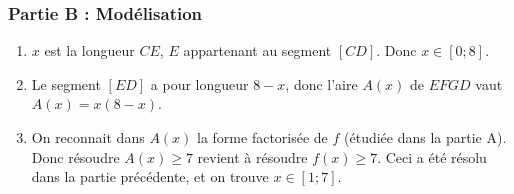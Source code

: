\documentclass[12pt]{article}
\begin{document}
\begin{exercice}
  \subsubsection*{Partie B : Modélisation}
  \begin{enumerate}
    \item $x$ est la longueur $CE$, $E$ appartenant au segment $[CD]$. Donc
      $x\in\left[0;8\right]$.
    \item Le segment $[ED]$ a pour longueur $8-x$, donc l'aire $A(x)$ de $EFGD$ vaut $A(x)=x(8-x)$.
    \item On reconnait dans $A(x)$ la forme factorisée de $f$ (étudiée dans
      la partie A). Donc résoudre $A(x)\geq7$ revient à résoudre $f(x)\geq7$.
      Ceci a été résolu dans la partie précédente, et on trouve
      $x\in\left[1;7\right]$.
  \end{enumerate}
\end{exercice}

\newpage
\end{document}

